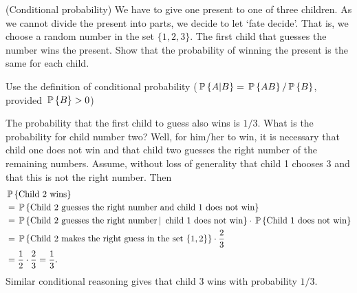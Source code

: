 \begin{question}(Conditional probability)
  We have to give one present to one of three children. As we cannot
  divide the present into parts, we decide to let `fate decide'. That
  is, we choose a random number in the set $\{1, 2, 3\}$. The first
  child that guesses the number wins the present. Show that the
  probability of winning the present is the same for each child.
\begin{solution}
    Use the definition of conditional probability
    ($\P{A|B} = \P{AB}/\P{B}$, provided $\P{B}>0$)

    The probability that the first child to guess also wins is
    $1/3$. What is the probability for child number two? Well, for
    him/her to win, it is necessary that child one does not win and
    that child two guesses the right number of the remaining
    numbers. Assume, without loss of generality that child 1 chooses
    $3$ and that this is not the right number. Then 
    \begin{equation*}
      \begin{split}
&\P{\text{Child  2 wins}} \\
&= \P{\text{Child 2 guesses the right number and child 1 does not win}} \\
&= \P{\text{Child 2 guesses the right number} \given \text{ child 1 does not win}}
\cdot \P{\text{Child 1 does not win}} \\
&= \P{\text{Child 2 makes the right guess in the set $\{1,2\}$}}\cdot \frac 23 \\
&= \frac 1 2\cdot \frac 23  = \frac 1 3.
      \end{split}
    \end{equation*}
    Similar conditional reasoning gives that child 3 wins with probability $1/3$. 
  \end{solution}
\end{question}

